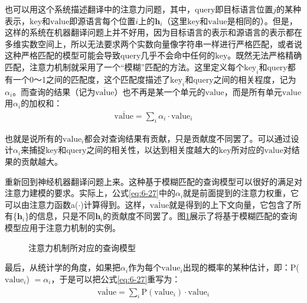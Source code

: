 \parinterval 也可以用这个系统描述翻译中的注意力问题，其中，$\mathrm{query}$即目标语言位置$j$的某种表示，$\mathrm{key}$和$\mathrm{value}$即源语言每个位置$i$上的${\mathbf{h}_i}$（这里$\mathrm{key}$和$\mathrm{value}$是相同的）。但是，这样的系统在机器翻译问题上并不好用，因为目标语言的表示和源语言的表示都在多维实数空间上，所以无法要求两个实数向量像字符串一样进行严格匹配，或者说这种严格匹配的模型可能会导致$\mathrm{query}$几乎不会命中任何的$\mathrm{key}$。既然无法严格精确匹配，注意力机制就采用了一个``模糊''匹配的方法。这里定义每个$\mathrm{key}_i$和$\mathrm{query}$都有一个0～1之间的匹配度，这个匹配度描述了$\mathrm{key}_i$和$\mathrm{query}$之间的相关程度，记为$\alpha_i$。而查询的结果（记为$\overline{\mathrm{value}}$）也不再是某一个单元的$\mathrm{value}$，而是所有单元$\mathrm{value}$用$\alpha_i$的加权和：
\begin{eqnarray}
\overline{\mathrm{value}} = \sum_i \alpha_i \cdot {\mathrm{value}}_i
\label{eq:6-27}
\end{eqnarray}

\noindent 也就是说所有的$\mathrm{value}_i$都会对查询结果有贡献，只是贡献度不同罢了。可以通过设计$\alpha_i$来捕捉$\mathrm{key}$和$\mathrm{query}$之间的相关性，以达到相关度越大的$\mathrm{key}$所对应的$\mathrm{value}$对结果的贡献越大。

\parinterval 重新回到神经机器翻译问题上来。这种基于模糊匹配的查询模型可以很好的满足对注意力建模的要求。实际上，公式\ref{eq:6-27}中的$\alpha_i$就是前面提到的注意力权重，它可以由注意力函数a($\cdot$)计算得到。这样，$\overline{\mathrm{value}}$就是得到的上下文向量，它包含了所有\{$\mathbf{h}_i$\}的信息，只是不同$\mathbf{h}_i$的贡献度不同罢了。图\ref{fig:6-27}展示了将基于模糊匹配的查询模型应用于注意力机制的实例。

\begin{figure}[htp]
\centering

\caption{注意力机制所对应的查询模型}
\label{fig:6-27}
\end{figure}

\parinterval 最后，从统计学的角度，如果把$\alpha_i$作为每个$\mathrm{value}_i$出现的概率的某种估计，即：P($\mathrm{value}_i$) $= \alpha_i$，于是可以把公式\ref{eq:6-27}重写为：
\begin{eqnarray}
\overline{\mathrm{value}} = \sum_i \textrm{P}( {\mathrm{value}}_i) \cdot {\mathrm{value}}_i
\label{eq:6-28}
\end{eqnarray}

